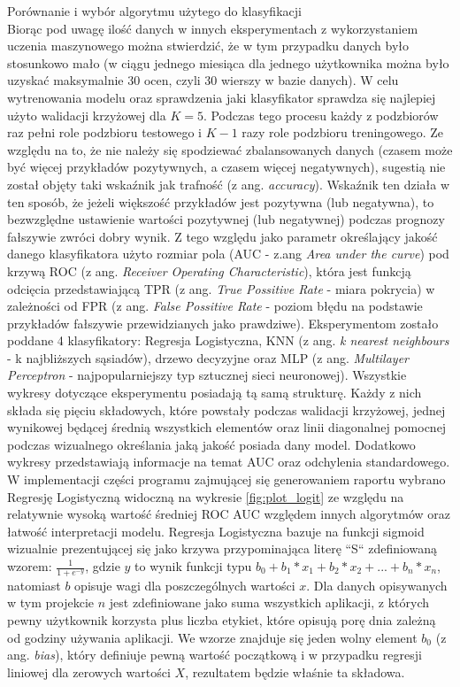 \documentclass[a4paper,twoside,12pt]{book}
\newcommand{\obcy}[1]{\emph{#1}}
\newcommand{\ang}[1]{{\selectlanguage{british}\obcy{#1}}}
\begin{document}
\begin{description}
\item Porównanie i wybór algorytmu użytego do klasyfikacji
\hfill \\
Biorąc pod uwagę ilość danych w innych eksperymentach z wykorzystaniem uczenia maszynowego można stwierdzić, że w tym przypadku danych było stosunkowo mało (w ciągu jednego miesiąca dla jednego użytkownika można było uzyskać maksymalnie 30 ocen, czyli 30 wierszy w bazie danych). W celu wytrenowania modelu oraz sprawdzenia jaki klasyfikator sprawdza się najlepiej użyto walidacji krzyżowej dla $ K = 5 $. Podczas tego procesu każdy z podzbiorów raz pełni role podzbioru testowego i $ K-1 $ razy role podzbioru treningowego. Ze względu na to, że nie należy się spodziewać zbalansowanych danych (czasem może być więcej przykładów pozytywnych, a czasem więcej negatywnych), sugestią nie został objęty taki wskaźnik jak trafność (z ang. \ang{accuracy}). Wskaźnik ten działa w ten sposób, że jeżeli większość przykładów jest pozytywna (lub negatywna), to bezwzględne ustawienie wartości pozytywnej (lub negatywnej) podczas prognozy fałszywie zwróci dobry wynik. Z tego względu jako parametr określający jakość danego klasyfikatora użyto rozmiar pola (AUC - z.ang \ang{Area under the curve}) pod krzywą ROC (z ang. \ang{Receiver Operating Characteristic}), która jest funkcją odcięcia przedstawiającą TPR (z ang. \ang{True Possitive Rate} - miara pokrycia) w zależności od FPR (z ang. \ang{False Possitive Rate} - poziom błędu na podstawie przykładów fałszywie przewidzianych jako prawdziwe)\cite{auc_roc}. Eksperymentom zostało poddane 4 klasyfikatory: Regresja Logistyczna, KNN (z ang. \ang{k nearest neighbours} - k najbliższych sąsiadów), drzewo decyzyjne oraz MLP (z ang. \ang{Multilayer Perceptron} - najpopularniejszy typ sztucznej sieci neuronowej). Wszystkie wykresy dotyczące eksperymentu posiadają tą samą strukturę. Każdy z nich składa się pięciu składowych, które powstały podczas walidacji krzyżowej, jednej wynikowej będącej średnią wszystkich elementów oraz linii diagonalnej pomocnej podczas wizualnego określania jaką jakość posiada dany model. Dodatkowo wykresy przedstawiają informacje na temat AUC oraz odchylenia standardowego. W implementacji części programu zajmującej się generowaniem raportu wybrano Regresję Logistyczną widoczną na wykresie \ref{fig:plot_logit} ze względu na relatywnie wysoką wartość średniej ROC AUC względem innych algorytmów oraz łatwość interpretacji modelu. Regresja Logistyczna bazuje na funkcji sigmoid wizualnie prezentującej się jako krzywa przypominająca literę ``S`` zdefiniowaną wzorem: 
$
\frac{1}{1 + e^{-y}}
$, gdzie $ y $ to wynik funkcji typu 
$
b_{0} + b_{1}*x_{1} + b_{2}*x_{2} + ... + b_{n}*x_{n}
$, natomiast $ b $ opisuje wagi dla poszczególnych wartości $ x $. Dla danych opisywanych w tym projekcie $ n $ jest zdefiniowane jako suma wszystkich aplikacji, z których pewny użytkownik korzysta plus liczba etykiet, które opisują porę dnia zależną od godziny używania aplikacji. We wzorze znajduje się jeden wolny element $ b_{0} $ (z ang. \ang{bias}), który definiuje pewną wartość początkową i w przypadku regresji liniowej dla zerowych wartości $ X $, rezultatem będzie właśnie ta składowa.  



\end{description}
\end{document}
